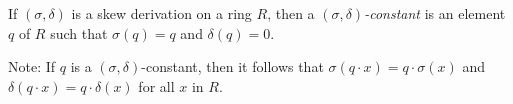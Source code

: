 \documentclass{article}
\begin{document}
If $(\sigma, \delta)$ is a skew derivation on a ring $R$,
then a {\it $(\sigma, \delta)$-constant} is an element $q$ of $R$
such that $\sigma(q)=q$ and $\delta(q)=0$.
\par
Note: If $q$ is a $(\sigma, \delta)$-constant,
then it follows that $\sigma(q \cdot x)=q \cdot \sigma(x)$
and $\delta(q \cdot x)=q \cdot \delta(x)$ for all $x$ in $R$.
\end{document}
